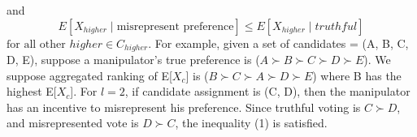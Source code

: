 \documentclass[letterpaper]{article} %
\begin{document}
and 
\begin{equation}
E[X_{higher} \mid \text{misrepresent preference}] \le E[X_{higher} \mid truthful]
\end{equation}
$\text{for all other } higher \in C_{higher}.$
For example, given a set of candidates = (A, B, C, D, E), suppose a manipulator’s true preference is ($A\succ B\succ C\succ D\succ E$). We suppose aggregated ranking of E[$X_c$] is ($B\succ C\succ A\succ D\succ E$) where B has the highest E[$X_c$]. For $l=2$, if candidate assignment is (C, D), then the manipulator has an incentive to misrepresent his preference. Since truthful voting is $C\succ D$, and misrepresented vote is $D \succ C$, the inequality (1) is satisfied. 
\end{document}
